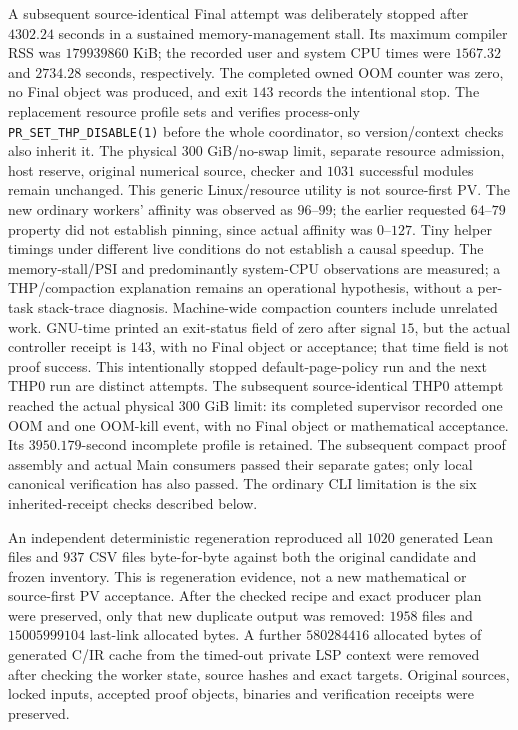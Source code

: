 \documentclass[11pt]{article}
\begin{document}
A subsequent source-identical Final attempt was deliberately stopped after
\(4302.24\) seconds in a sustained memory-management stall. Its maximum
compiler RSS was \(179939860\) KiB; the recorded user and system CPU times
were \(1567.32\) and \(2734.28\) seconds, respectively. The completed owned
OOM counter was zero, no Final object was produced, and exit \(143\)
records the intentional stop. The replacement resource profile sets and
verifies process-only \texttt{PR\_SET\_THP\_DISABLE(1)} before the whole
coordinator, so version/context checks also inherit it. The physical
\(300\) GiB/no-swap limit, separate resource admission, host reserve,
original numerical source, checker and \(1031\) successful modules remain
unchanged. This generic Linux/resource utility is not source-first PV.
The new ordinary workers' affinity was observed as \(96\)--\(99\);
the earlier requested \(64\)--\(79\) property did not establish pinning,
since actual affinity was \(0\)--\(127\). Tiny helper timings under different
live conditions do not establish a causal speedup. The memory-stall/PSI and predominantly system-CPU observations are measured;
a THP/compaction explanation remains an operational hypothesis, without a
per-task stack-trace diagnosis. Machine-wide compaction counters include
unrelated work. GNU-time printed an exit-status field of zero after signal
\(15\), but the actual controller receipt is \(143\), with no Final object
or acceptance; that time field is not proof success. This intentionally stopped
default-page-policy run and the next THP0 run are distinct attempts.
The subsequent source-identical THP0 attempt reached the actual physical
\(300\) GiB limit: its completed supervisor recorded one OOM and one
OOM-kill event, with no Final object or mathematical acceptance. Its
\(3950.179\)-second incomplete profile is retained. The subsequent compact
proof assembly and actual Main consumers passed their separate gates; only
local canonical verification has also passed. The ordinary CLI limitation is
the six inherited-receipt checks described below.

An independent deterministic regeneration reproduced all \(1020\) generated
Lean files and \(937\) CSV files byte-for-byte against both the original
candidate and frozen inventory. This is regeneration evidence, not a new
mathematical or source-first PV acceptance. After the checked recipe and
exact producer plan were preserved, only that new duplicate output was
removed: \(1958\) files and \(15005999104\) last-link allocated bytes.
A further \(580284416\) allocated bytes of generated C/IR cache from the
timed-out private LSP context were removed after checking the worker state,
source hashes and exact targets. Original sources, locked inputs, accepted
proof objects, binaries and verification receipts were preserved.
\end{document}
